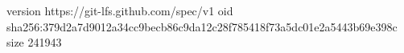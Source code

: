 version https://git-lfs.github.com/spec/v1
oid sha256:379d2a7d9012a34cc9becb86c9da12c28f785418f73a5dc01e2a5443b69e398c
size 241943
